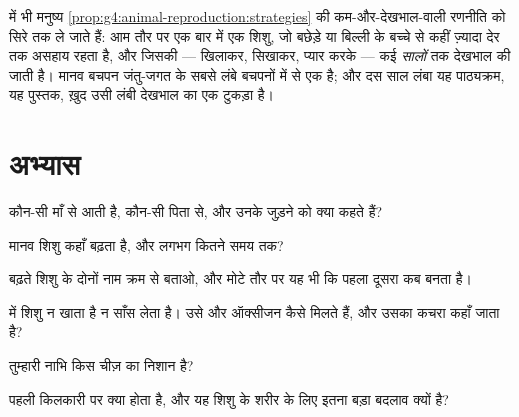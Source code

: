 \begin{example}[बहुत देखभाल वाली एक प्रजाति]\label{ex:g5:human-reproduction:longcare}
 में भी मनुष्य
\cref{prop:g4:animal-reproduction:strategies} की
कम-और-देखभाल-वाली रणनीति को सिरे तक ले जाते हैं: आम तौर पर एक बार में
एक शिशु, जो बछेड़े या बिल्ली के बच्चे से कहीं ज़्यादा देर तक असहाय रहता
है, और जिसकी --- खिलाकर, सिखाकर, प्यार करके --- कई \emph{सालों} तक
देखभाल की जाती है। मानव बचपन जंतु-जगत के सबसे लंबे बचपनों में से एक है;
और दस साल लंबा यह पाठ्यक्रम, यह पुस्तक, ख़ुद उसी लंबी देखभाल का एक
टुकड़ा है।
\end{example}

\section{अभ्यास}

\begin{exercise}[$\star$]\label{exo:g5:human-reproduction:1}
कौन-सी  माँ से आती है, कौन-सी पिता से, और उनके जुड़ने को क्या
कहते हैं?
\end{exercise}

\begin{exercise}[$\star$]\label{exo:g5:human-reproduction:2}
मानव शिशु कहाँ बढ़ता है, और लगभग कितने समय तक?
\end{exercise}

\begin{exercise}[$\star$]\label{exo:g5:human-reproduction:3}
बढ़ते शिशु के दोनों नाम क्रम से बताओ, और मोटे तौर पर यह भी कि पहला
दूसरा कब बनता है।
\end{exercise}

\begin{exercise}[$\star$]\label{exo:g5:human-reproduction:4}
 में शिशु न खाता है न साँस लेता है। उसे  और ऑक्सीजन
कैसे मिलते हैं, और उसका कचरा कहाँ जाता है?
\end{exercise}

\begin{exercise}[$\star$]\label{exo:g5:human-reproduction:5}
तुम्हारी नाभि किस चीज़ का निशान है?
\end{exercise}

\begin{exercise}[$\star$]\label{exo:g5:human-reproduction:6}
पहली किलकारी पर क्या होता है, और यह शिशु के शरीर के लिए इतना बड़ा
बदलाव क्यों है?
\end{exercise}

